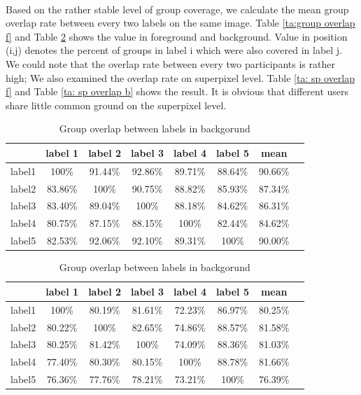 \documentclass[runningheads,a4paper]{llncs}
\begin{document}
\paragraph{} Based on the rather stable level of group coverage, we calculate the mean group overlap rate between every two labels on the same image. Table \ref{ta:group overlap f} and Table \ref{ta:group overlap b}  shows the value in foreground and background. Value in position (i,j) denotes the percent of groups in label i which were also covered in label j. We could note that the overlap rate between every two participants is rather high; We also examined the overlap rate on superpixel level. Table \ref{ta: sp overlap f} and Table \ref{ta: sp overlap b} shows the result. It is obvious that different users share little common ground on the superpixel level.

\begin{table}
\parbox{.35\linewidth}{
\centering
\begin{tabular}{|c|c|c|c|c|c|c|c|}
\hline
 & label 1 & label 2&label 3&label 4&label 5&mean\\
\hline
label1& 100\% & 91.44\% & 92.86\%& 89.71\%& 88.64\%&90.66\%\\
\hline
label2& 83.86\% & 100\% & 90.75\%& 88.82\%& 85.93\%&87.34\%\\
\hline
label3& 83.40\% & 89.04\% & 100\%& 88.18\%& 84.62\%&86.31\% \\
\hline
label4& 80.75\% & 87.15\% & 88.15\%& 100\%& 82.44\%&84.62\% \\
\hline
label5& 82.53\% & 92.06\% & 92.10\%& 89.31\%& 100\%&90.00\% \\
\hline
\end{tabular}\captionsetup{justification=centerlast}
\caption{Group overlap between labels in foregorund}
\label{ta:group overlap f}
}
\hfill
\parbox{.35\linewidth}{
\centering
\begin{tabular}{|c|c|c|c|c|c|c|c|}
\hline
 & label 1 & label 2&label 3&label 4&label 5&mean\\
\hline
label1& 100\% &80.19\% & 81.61\%& 72.23\%& 86.97\%&80.25\%\\
\hline
label2& 80.22\% & 100\% & 82.65\%& 74.86\%& 88.57\%&81.58\% \\
\hline
label3& 80.25\% & 81.42\% & 100\%& 74.09\%& 88.36\%&81.03\%\\
\hline
label4& 77.40\% & 80.30\% & 80.15\%& 100\%& 88.78\%&81.66\% \\
\hline
label5& 76.36\% & 77.76\% & 78.21\%& 73.21\%& 100\%&76.39\%\\
\hline
\end{tabular}

\captionsetup{justification=centerlast}
\caption{Group overlap between labels in backgorund}
\label{ta:group overlap b}
}
\end{table}
\end{document}
